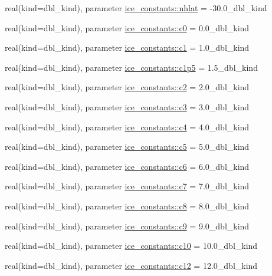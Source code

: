 \begin{DoxyCompactItemize}
\item 
real(kind=dbl\_\-kind), parameter \hyperlink{namespaceice__constants_aa70b4958fc93295f5b57f1dd21fd4ebe}{ice\_\-constants::nhlat} = -\/30.0\_\-dbl\_\-kind
\item 
real(kind=dbl\_\-kind), parameter \hyperlink{namespaceice__constants_a8320d3c058c4ae0e12bbf1b11305e51e}{ice\_\-constants::c0} = 0.0\_\-dbl\_\-kind
\item 
real(kind=dbl\_\-kind), parameter \hyperlink{namespaceice__constants_a74c3f6d59942aec40dda487c6af99039}{ice\_\-constants::c1} = 1.0\_\-dbl\_\-kind
\item 
real(kind=dbl\_\-kind), parameter \hyperlink{namespaceice__constants_afa5b0477438de8f4ade05dd69ff9d8bb}{ice\_\-constants::c1p5} = 1.5\_\-dbl\_\-kind
\item 
real(kind=dbl\_\-kind), parameter \hyperlink{namespaceice__constants_a683e0c28523a17a5d2cd40066167570a}{ice\_\-constants::c2} = 2.0\_\-dbl\_\-kind
\item 
real(kind=dbl\_\-kind), parameter \hyperlink{namespaceice__constants_a0ae384e716bc1243a7bd1c6d1ace209f}{ice\_\-constants::c3} = 3.0\_\-dbl\_\-kind
\item 
real(kind=dbl\_\-kind), parameter \hyperlink{namespaceice__constants_a6f2f40b7da63dfa1a4f38dd0126cd848}{ice\_\-constants::c4} = 4.0\_\-dbl\_\-kind
\item 
real(kind=dbl\_\-kind), parameter \hyperlink{namespaceice__constants_ad0d6a9a37c461f0151a268757a15c5a4}{ice\_\-constants::c5} = 5.0\_\-dbl\_\-kind
\item 
real(kind=dbl\_\-kind), parameter \hyperlink{namespaceice__constants_aa876727d14c4b68b2c933645bde4592a}{ice\_\-constants::c6} = 6.0\_\-dbl\_\-kind
\item 
real(kind=dbl\_\-kind), parameter \hyperlink{namespaceice__constants_a6f7e96de04b10ee2c94362546255969f}{ice\_\-constants::c7} = 7.0\_\-dbl\_\-kind
\item 
real(kind=dbl\_\-kind), parameter \hyperlink{namespaceice__constants_a16db17f9e3975da388c0c98f14393bc2}{ice\_\-constants::c8} = 8.0\_\-dbl\_\-kind
\item 
real(kind=dbl\_\-kind), parameter \hyperlink{namespaceice__constants_a8fad19fc3e19d7387132c4b3184f62d8}{ice\_\-constants::c9} = 9.0\_\-dbl\_\-kind
\item 
real(kind=dbl\_\-kind), parameter \hyperlink{namespaceice__constants_a29dded1ebf63a0561a70a7d94d016fa7}{ice\_\-constants::c10} = 10.0\_\-dbl\_\-kind
\item 
real(kind=dbl\_\-kind), parameter \hyperlink{namespaceice__constants_ad58b4990ce1a83ae0c0ca55a61e8ed1e}{ice\_\-constants::c12} = 12.0\_\-dbl\_\-kind

\end{DoxyCompactItemize}
